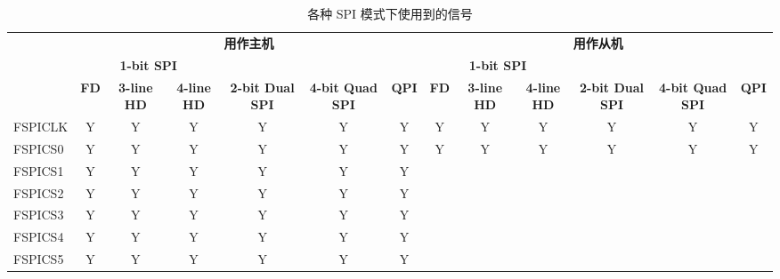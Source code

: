 \documentclass[main\_\_CN.tex]{subfiles}
\begin{document}
\begin{landscape}
\begin{table}[H]
    \centering
    \caption{各种 SPI 模式下使用到的信号}
    \label{tab:pins-singals-used-in-various-spi-modes}

    \begin{threeparttable}
    \begin{tabular}{ |p{2.0cm} |c|c|c|c|c|c|c|c|c|c|c|c| }
    \hline
        \rowcolor{lightgray}
        & \multicolumn{6}{c|}{\textbf{用作主机}} & \multicolumn{6}{c|}{\textbf{用作从机}} \\\cline{2-13}
        \rowcolor{lightgray}
        & \multicolumn{3}{c|}{\textbf{1-bit SPI}} & & & & \multicolumn{3}{c|}{\textbf{1-bit SPI}} & & & \\ \cline{2-4} \cline{8-10}
        \rowcolor{lightgray}
        \multirow{-3}{*}{\textbf{FSPI 总线信号}} & \textbf{FD\tnote{1}} & \textbf{3-line HD\tnote{2}} & \textbf{4-line HD} & \multirow{-2}{*}{\textbf{2-bit Dual SPI}} & \multirow{-2}{*}{\textbf{4-bit Quad SPI}} & \multirow{-2}{*}{\textbf{QPI}} & \textbf{FD} & \textbf{3-line HD} & \textbf{4-line HD} & \multirow{-2}{*}{\textbf{2-bit Dual SPI}} & \multirow{-2}{*}{\textbf{4-bit Quad SPI}} & \multirow{-2}{*}{\textbf{QPI}} \\ \hline
FSPICLK                  & Y       & Y       & Y       & Y       & Y       & Y      & Y       & Y      & Y       & Y       & Y       & Y      \\ \hline
FSPICS0                  & Y       & Y       & Y       & Y       & Y       & Y      & Y       & Y      & Y       & Y       & Y       & Y      \\ \hline
FSPICS1                  & Y       & Y       & Y       & Y       & Y       & Y      &         &        &         &         &         &        \\ \hline
FSPICS2                  & Y       & Y       & Y       & Y       & Y       & Y      &         &        &         &         &         &        \\ \hline
FSPICS3                  & Y       & Y       & Y       & Y       & Y       & Y      &         &        &         &         &         &        \\ \hline
FSPICS4                  & Y       & Y       & Y       & Y       & Y       & Y      &         &        &         &         &         &        \\ \hline
FSPICS5                  & Y       & Y       & Y       & Y       & Y       & Y      &         &        &         &         &         &        \\ \hline

\end{tabular}
\end{threeparttable}
\end{table}
\end{landscape}
\end{document}
